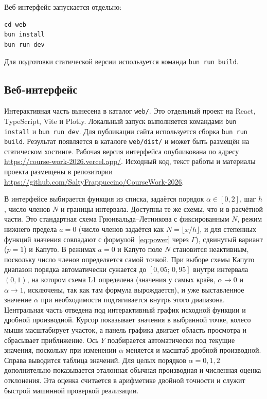 \documentclass[14pt,a4paper]{extarticle}
\begin{document}
Веб-интерфейс запускается отдельно:
\begin{lstlisting}
cd web
bun install
bun run dev
\end{lstlisting}
Для подготовки статической версии используется команда \texttt{bun run build}.

\subsection{Веб-интерфейс}

Интерактивная часть вынесена в каталог \texttt{web/}. Это отдельный проект на React, TypeScript, Vite и Plotly. Локальный запуск выполняется командами \texttt{bun install} и \texttt{bun run dev}. Для публикации сайта используется сборка \texttt{bun run build}. Результат появляется в каталоге \texttt{web/dist/} и может быть размещён на статическом хостинге. Рабочая версия интерфейса опубликована по адресу \url{https://course-work-2026.vercel.app/}. Исходный код, текст работы и материалы проекта размещены в репозитории \url{https://github.com/SaltyFrappuccino/CourseWork-2026}.

В интерфейсе выбирается функция из списка, задаётся порядок $\alpha\in[0,2]$, шаг $h$, число членов $N$ и границы интервала. Доступны те же схемы, что и в расчётной части. Это стандартная схема Грюнвальда--Летникова с фиксированным $N$, режим нижнего предела $a=0$ (число членов задаётся как $N=\lfloor x/h\rfloor$, и для степенных функций значения совпадают с формулой~\eqref{eq:power} через $\Gamma$), сдвинутый вариант ($p=1$) и Капуто. В режимах $a=0$ и Капуто поле $N$ становится неактивным, поскольку число членов определяется самой точкой. При выборе схемы Капуто диапазон порядка автоматически сужается до $[0{,}05;\,0{,}95]$ внутри интервала $(0,1)$, на котором схема L1 определена (значения у самых краёв, $\alpha\to0$ и $\alpha\to1$, исключены, так как там формула вырождается), и уже выставленное значение $\alpha$ при необходимости подтягивается внутрь этого диапазона. Центральная часть отведена под интерактивный график исходной функции и дробной производной. Курсор показывает значения в выбранной точке, колесо мыши масштабирует участок, а панель графика двигает область просмотра и сбрасывает приближение. Ось $Y$ подбирается автоматически под текущие значения, поскольку при изменении $\alpha$ меняется и масштаб дробной производной. Справа выводится таблица значений. Для целых порядков $\alpha=0,1,2$ дополнительно показывается эталонная обычная производная и численная оценка отклонения. Эта оценка считается в арифметике двойной точности и служит быстрой машинной проверкой реализации.
\end{document}
